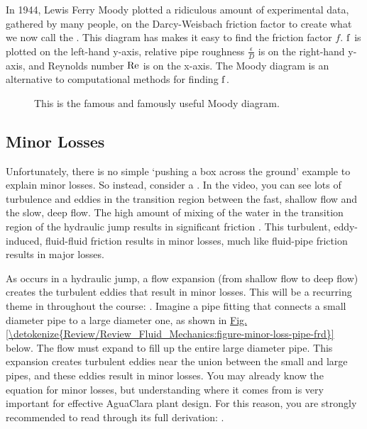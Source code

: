 \documentclass[letterpaper,10pt,english]{sphinxmanual}
\let\sphinxpxdimen\pdfpxdimen\else\newdimen\sphinxpxdimen
\begin{document}
In 1944, Lewis Ferry Moody plotted a ridiculous amount of experimental data, gathered by many people, on the Darcy-Weisbach friction factor to create what we now call the . This diagram has makes it easy to find the friction factor \(f\). \(\rm{f}\) is plotted on the left-hand y-axis, relative pipe roughness \(\frac{\epsilon}{D}\) is on the right-hand y-axis, and Reynolds number \(\rm{Re}\) is on the x-axis. The Moody diagram is an alternative to computational methods for finding \(\rm{f}\).

\begin{figure}[htbp]
\centering
\capstart

\noindent\sphinxincludegraphics[width=650\sphinxpxdimen]{{Moody}.jpg}
\caption{This is the famous and famously useful Moody diagram.}\label{\detokenize{Review/Review_Fluid_Mechanics:id6}}\label{\detokenize{Review/Review_Fluid_Mechanics:figure-moody}}\end{figure}


\subsection{Minor Losses}
\label{\detokenize{Review/Review_Fluid_Mechanics:minor-losses}}\label{\detokenize{Review/Review_Fluid_Mechanics:heading-minor-losses}}
Unfortunately, there is no simple ‘pushing a box across the ground’ example to explain minor losses. So instead, consider a . In the video, you can see lots of turbulence and eddies in the transition region between the fast, shallow flow and the slow, deep flow. The high amount of mixing of the water in the transition region of the hydraulic jump results in significant friction . This turbulent, eddy-induced, fluid-fluid friction results in  minor losses, much like fluid-pipe friction results in major losses.

As occurs in a hydraulic jump, a flow expansion (from shallow flow to deep flow) creates the turbulent eddies that result in minor losses. This will be a recurring theme in throughout the course: . Imagine a pipe fitting that connects a small diameter pipe to a large diameter one, as shown in \hyperref[\detokenize{Review/Review_Fluid_Mechanics:figure-minor-loss-pipe-frd}]{Fig.\@ \ref{\detokenize{Review/Review_Fluid_Mechanics:figure-minor-loss-pipe-frd}}} below. The flow must expand to fill up the entire large diameter pipe. This expansion creates turbulent eddies near the union between the small and large pipes, and these eddies result in minor losses. You may already know the equation for minor losses, but understanding where it comes from is very important for effective AguaClara plant design. For this reason, you are strongly recommended to read through its full derivation: {\hyperref[\detokenize{Review/Review_Fluid_Mechanics_Derivations:title-review-fluid-mechanics-derivations}]{}}.
\end{document}
